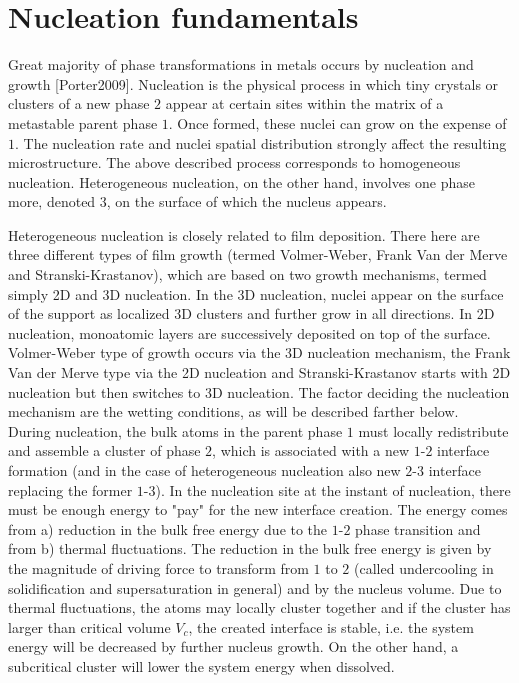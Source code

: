 \section{Nucleation fundamentals}
{\color{red}{CNT assumes that the nuclei are large enough to have defined volume and surface. With nuclei consisting of only a few atoms, these and the derived quantities (specific surface energy) may not be defined.} }

Great majority of phase transformations in metals occurs by nucleation and growth [Porter2009]. Nucleation is the physical process in which tiny crystals or clusters of a new phase $\mathit{2}$ appear at certain sites within the matrix of a metastable parent phase $\mathit{1}$. Once formed, these nuclei can grow on the expense of $\mathit{1}$. The nucleation rate and nuclei spatial distribution strongly affect the resulting microstructure. The above described process corresponds to homogeneous nucleation. Heterogeneous nucleation, on the other hand, involves one phase more, denoted $\mathit{3}$, on the surface of which the nucleus appears. 

Heterogeneous nucleation is closely related to film deposition. There here are three different types of film growth (termed Volmer-Weber, Frank Van der Merve and Stranski-Krastanov), which are based on two growth mechanisms, termed simply 2D and 3D nucleation. In the 3D nucleation, nuclei appear on the surface of the support as localized 3D clusters and further grow in all directions. In 2D nucleation, monoatomic layers are successively deposited on top of the surface. Volmer-Weber type of growth occurs via the 3D nucleation mechanism, the Frank Van der Merve type via the 2D nucleation and Stranski-Krastanov starts with 2D nucleation but then switches to 3D nucleation. The factor deciding the nucleation mechanism  are the wetting conditions, as will be described farther below.  \\

During nucleation, the bulk atoms in the parent phase $\mathit{1}$ must locally redistribute and assemble a cluster of phase $\mathit{2}$, which is associated with a new $\mathit{1}$-$\mathit{2}$ interface formation (and in the case of heterogeneous nucleation also new $\mathit{2}$-$\mathit{3}$ interface replacing the former $\mathit{1}$-$\mathit{3}$). In the nucleation site at the instant of nucleation, there must be enough energy to "pay" for the new interface creation. The energy comes from a) reduction in the bulk free energy due to the $\mathit{1}$-$\mathit{2}$ phase transition and from b) thermal fluctuations. The reduction in the bulk free energy is given by the magnitude of driving force to transform from $\mathit{1}$ to $\mathit{2}$ (called undercooling in solidification and supersaturation in general) and by the nucleus volume. Due to thermal fluctuations, the atoms may locally cluster together and if the cluster has larger than critical volume $V_c$, the created interface is stable, i.e. the system energy will be decreased by further nucleus growth. On the other hand, a subcritical cluster will lower the system energy when dissolved.

